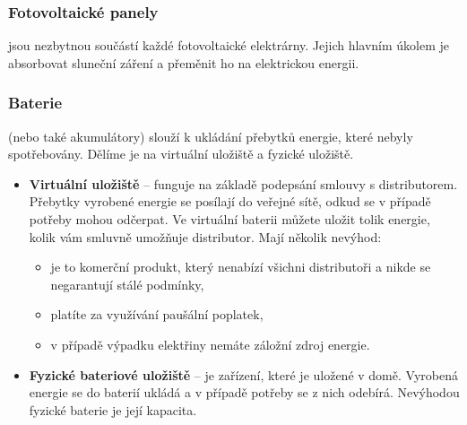 \subsubsection{Fotovoltaické panely}

jsou nezbytnou součástí každé fotovoltaické elektrárny.
Jejich hlavním úkolem je absorbovat sluneční záření a přeměnit ho na elektrickou energii.

\subsubsection{Baterie}

(nebo také akumulátory) slouží k ukládání přebytků energie, které nebyly spotřebovány.
Dělíme je na virtuální uložiště a fyzické uložiště.

\begin{itemize}
    \item \textbf{Virtuální uložiště} -- funguje na základě podepsání smlouvy s distributorem. Přebytky vyrobené energie se posílají do veřejné sítě, odkud se v případě potřeby mohou odčerpat.  Ve virtuální baterii můžete uložit tolik energie, kolik vám smluvně umožňuje distributor. Mají několik nevýhod:
    \begin{itemize}
        \item je to komerční produkt, který nenabízí všichni distributoři a nikde se negarantují stálé podmínky,
        \item platíte za využívání paušální poplatek,
        \item v případě výpadku elektřiny nemáte záložní zdroj energie.
    \end{itemize}
    \item \textbf{Fyzické bateriové uložiště} -- je zařízení, které je uložené v domě. Vyrobená energie se do baterií ukládá a v případě potřeby se z nich odebírá. Nevýhodou fyzické baterie je její kapacita.
\end{itemize}




